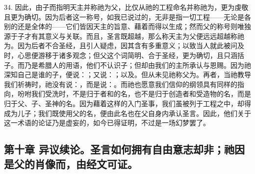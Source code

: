 34. 因此，由子而指明天主并称祂为父，比仅从祂的工程命名并称祂为，更为虔敬且更为确切。因为后者这一称号，如我已说过的，无非是指一切工程——无论是各别的还是全体的——它们皆因天主的旨意、藉着而得以生成；然而父的称号则唯独源于子才有其意义与关联。而且，圣言既超越，那么称天主为父便远远超越称祂为。因为后者不合圣经，且引人疑虑，因其含有多重意义；以致当人就此被问及时，心思便游移于诸多观念；但父这个词简明、合于圣经，更为确切，且只涵括子。而乃是希腊人的用语，他们不认识子；但却由我们的主所承认与恩赐。因为祂深知自己是谁的子，便说：；又说：；以及。但从未见祂称父为。再者，当祂教导我们祈祷时，祂没有说：，而是说：。而祂也愿意我们信仰的纲领具有同样的指向，吩咐我们受洗时，不是归于者和的名，也不是归于创造者和受造物的名，而是归于父、子、圣神的名。因为藉着这样的入门圣事，我们虽被列于工程之中，却得成为儿子；我们既使用父的名，便由此名也在父自身内承认圣言。因此，他们关于这一术语的论证乃是虚妄的，如今已得证明，不过是一场幻梦罢了。\par


\subsection{第十章 异议续论。圣言如何拥有自由意志却非；祂因是父的肖像而，由经文可证。}

